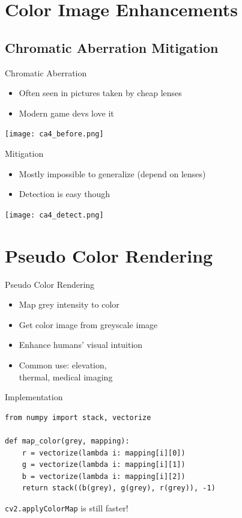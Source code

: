 \documentclass[pdf]{beamer}
\begin{document}
\section{Color Image Enhancements}
\frame{\tableofcontents[currentsection]}
\subsection{Chromatic Aberration Mitigation}
\begin{frame}{Chromatic Aberration}
  \begin{itemize}
    \item Often seen in pictures taken by cheap lenses
    \item Modern game devs love it
  \end{itemize}
  \begin{center}
    \texttt{[image: ca4\_before.png]}
  \end{center}
\end{frame}

\begin{frame}{Mitigation}
  \begin{itemize}
    \item Mostly impossible to generalize (depend on lenses)
    \item Detection is easy though
  \end{itemize}
  \begin{center}
    \texttt{[image: ca4\_detect.png]}
  \end{center}
\end{frame}

\section{Pseudo Color Rendering}
\frame{\tableofcontents[currentsection]}
\begin{frame}{Pseudo Color Rendering}\Large
  \begin{itemize}
    \item Map grey intensity to color
    \item Get color image from greyscale image
    \item Enhance humans' visual intuition
    \item Common use: elevation,\\
      thermal, medical imaging
  \end{itemize}
\end{frame}

\begin{frame}[fragile]{Implementation}
\begin{verbatim}
from numpy import stack, vectorize

def map_color(grey, mapping):
    r = vectorize(lambda i: mapping[i][0])
    g = vectorize(lambda i: mapping[i][1])
    b = vectorize(lambda i: mapping[i][2])
    return stack((b(grey), g(grey), r(grey)), -1)
\end{verbatim}

\verb|cv2.applyColorMap| is still faster!
\end{frame}
\end{document}
